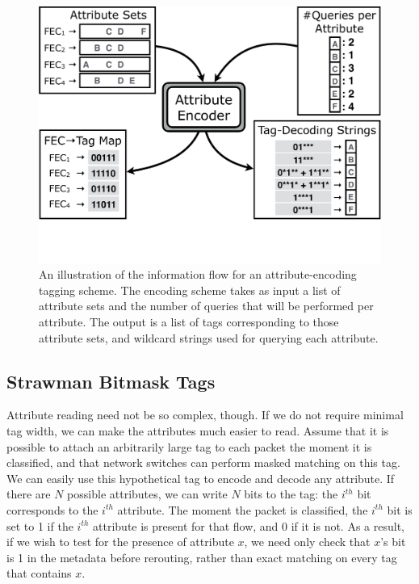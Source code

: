 \begin{figure}[t!] \begin{minipage}{1\linewidth} \includegraphics[trim={0 4cm 0
0}, clip, width=\linewidth]{figures/system_flow2} \end{minipage} \caption{An
illustration of the information flow for an attribute-encoding tagging scheme.
The encoding scheme takes as input a list of attribute sets and the number of
queries that will be performed per attribute. The output is a list of tags
corresponding to those attribute sets, and wildcard strings used for querying
each attribute.} \label{fig:system_flow} \end{figure}


\subsection{Strawman Bitmask Tags}

Attribute reading need not be so complex, though. If we do not require minimal
tag width, we can make the attributes much easier to read.  Assume that it is
possible to attach an arbitrarily large tag to each packet the moment it is
classified, and that network switches can perform masked matching on this tag.
We can easily use this hypothetical tag to encode and decode any attribute. If
there are $N$ possible attributes, we can write $N$ bits to the tag: the
$i^{th}$ bit corresponds to the $i^{th}$ attribute. The moment the packet is
classified, the $i^{th}$ bit is set to 1 if the $i^{th}$ attribute is present
for that flow, and 0 if it is not. As a result, if we wish to test for the
    presence of attribute $x$, we need only check that $x$'s bit is 1 in the
    metadata before rerouting, rather than exact matching on every tag that
    contains $x$.

